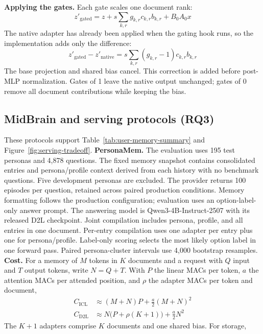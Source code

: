 \textbf{Applying the gates.} Each gate scales one document rank:
\begin{equation}
z'_{\mathrm{gated}}=z+s\sum_{k,r}g_{k,r}c_{k,r}b_{k,r}+B_0A_0x
\label{eq:gated-ranks}
\end{equation}
The native adapter has already been applied when the gating hook runs, so the
implementation adds only the difference:
\begin{equation}
z'_{\mathrm{gated}}-z'_{\mathrm{native}}
=s\sum_{k,r}(g_{k,r}-1)c_{k,r}b_{k,r}
\label{eq:gate}
\end{equation}
The base projection and shared bias cancel. This correction is added before
post-MLP normalization. Gates of 1 leave the native output unchanged; gates of
0 remove all document contributions while keeping the bias.

\subsection{MidBrain and serving protocols (RQ3)}
These protocols support Table~\ref{tab:user-memory-summary} and
Figure~\ref{fig:serving-tradeoff}.
\textbf{PersonaMem.} The evaluation uses 195 test personas and 4,878 questions. The
fixed memory snapshot contains consolidated entries and
persona/profile context derived from each history with no benchmark questions. Five
development personas are excluded. The provider returns 100 episodes per question,
retained across paired production conditions. Memory formatting follows the
production configuration; evaluation uses an option-label-only answer prompt.
The answering model is Qwen3-4B-Instruct-2507 with its released D2L
checkpoint. Joint compilation includes persona, profile, and all entries in one
document. Per-entry compilation uses one adapter per entry plus one for
persona/profile.
Label-only scoring selects the most likely option label in one
forward pass. Paired persona-cluster intervals use 4,000 bootstrap resamples.
\textbf{Cost.} For a memory of $M$ tokens in $K$ documents and a request with $Q$
input and $T$ output tokens, write $N=Q+T$. With $P$ the linear MACs per token, $a$ the attention
MACs per attended position, and $\rho$ the adapter MACs per token and document,
\begin{align}
C_{\mathrm{ICL}} &\approx (M+N)P+\tfrac{a}{2}(M+N)^2\label{eq:cost-icl}\\
C_{\mathrm{D2L}} &\approx N\big(P+\rho(K+1)\big)+\tfrac{a}{2}N^2\label{eq:cost-d2l}
\end{align}
The $K+1$ adapters comprise $K$ documents and one shared bias. For storage,
